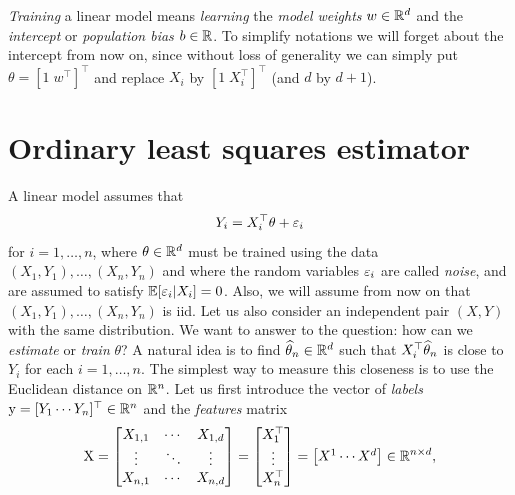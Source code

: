 \emph{Training} a linear model means \emph{learning} the \emph{model weights} $w \in \mathbb R^d$ and the \emph{intercept} or \emph{population bias} $b \in \mathbb R$.  
To simplify notations we will forget about the intercept from now on, since without loss of generality we can simply put $\theta = [1 \; w^\top]^\top$ and replace $X_i$ by $[1 \; X_i^\top]^\top$ (and $d$ by $d +1$).

\section{Ordinary least squares estimator} %
\label{sec:least_squares_estimator}

A linear model assumes that
\begin{equation*}
	Y_i = X_i^\top \theta  + \varepsilon_i
\end{equation*}
for $i=1, \ldots, n$, where $\theta \in \mathbb R^d$ must be trained using the data $(X_1, Y_1), \ldots, (X_n, Y_n)$ and where the random variables $\varepsilon_i$ are called \emph{noise}, and are assumed to satisfy $\mathbb E[\varepsilon_i | X_i] = 0$.
Also, we will assume from now on that $(X_1, Y_1), \ldots, (X_n, Y_n)$ is iid.
Let us also consider an independent pair $(X, Y)$ with the same distribution.
We want to answer to the question:
how can we \emph{estimate} or \emph{train} $\theta$?
A natural idea is to find $\widehat \theta_n \in \mathbb R^d$ such that $X_i^\top \widehat \theta_n$ is close to $Y_i$ for each $i=1, \ldots, n$. 
The simplest way to measure this closeness is to use the Euclidean distance on $\mathbb R^n$.
Let us first introduce the vector of \emph{labels} $\operatorname{{\boldsymbol y}} = [Y_1 \cdots Y_n]^\top \in \mathbb R^n$%
and the \emph{features} matrix
\begin{equation*}
	\operatorname{{\boldsymbol X}} = 
	\begin{bmatrix}
		X_{1, 1} & \cdots & X_{1, d} \\
		\vdots & \ddots & \vdots \\
		X_{n, 1} & \cdots & X_{n, d}
	\end{bmatrix}	
	=
	\begin{bmatrix}
		X_1^\top \\
		\vdots \\
		X_n^\top 
	\end{bmatrix}
	= 
	\begin{bmatrix}
		X^1 \cdots X^d
	\end{bmatrix}	
	\in \mathbb R^{n \times d},
\end{equation*}
